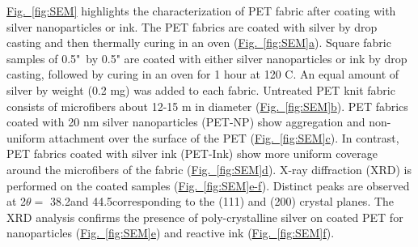 \documentclass[journal=jacsat,manuscript=article]{achemso}
\newcommand{\figref}[2][]{\hyperref[#2]{Fig.~\ref{#2}#1}}
\begin{document}
\figref{fig:SEM} highlights the characterization of PET fabric after coating with silver nanoparticles or ink.  
The PET fabrics are coated with silver by drop casting and then thermally curing in an oven %
(\figref[a]{fig:SEM}).  Square fabric samples of 
0.5"~by 0.5" are coated with either silver nanoparticles or ink by drop casting, followed by curing in an oven for 1 hour at 120 \degree C. An equal amount of silver by weight (0.2 mg) was added to each fabric. 
Untreated PET knit fabric consists of microfibers about 12-15 \micro m in diameter (\figref[b]{fig:SEM}). %
PET fabrics coated with 20 nm silver nanoparticles (PET-NP) show aggregation and non-uniform attachment over the surface of the PET (\figref[c]{fig:SEM}).  
In contrast, PET fabrics %
coated with silver ink (PET-Ink) 
show more uniform coverage around the microfibers of the fabric (\figref[d]{fig:SEM}). 
X-ray diffraction (XRD) is performed on the coated samples (\figref[e-f]{fig:SEM}). %
Distinct peaks are observed at 2$\theta =$ 38.2\degree and 44.5\degree corresponding to the (111) and (200) crystal planes. 
The XRD analysis confirms the presence of poly-crystalline silver on coated PET for nanoparticles (\figref[e]{fig:SEM}) and reactive ink (\figref[f]{fig:SEM}). %



\end{document}
